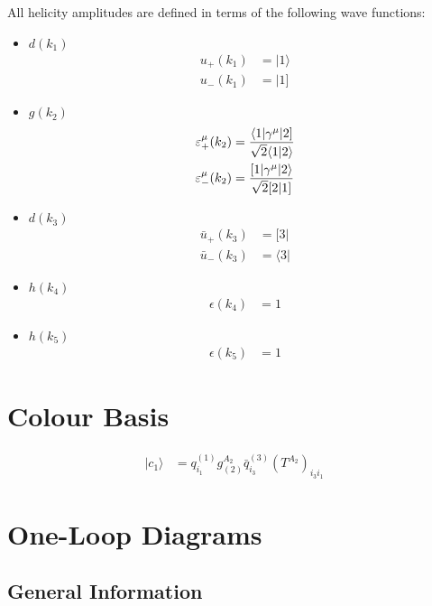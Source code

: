 \documentclass[a4paper]{article}
\newcommand{\bra}[1]{\langle #1 \vert}
\newcommand{\brb}[1]{[ #1 \vert}
\newcommand{\kea}[1]{\vert #1 \rangle}
\newcommand{\keb}[1]{\vert #1 ]}
\newcommand{\Spaa}[1]{\langle #1 \rangle}
\newcommand{\Spab}[1]{\langle #1]}
\newcommand{\Spba}[1]{[ #1 \rangle}
\newcommand{\Spbb}[1]{[ #1 ]}
\begin{document}
All helicity amplitudes are defined in terms of the following wave functions:
\begin{itemize}
\item $d(k_{1})$ 
\begin{align}
u_+(k_{1}) &= \kea{1}\\
u_-(k_{1}) &= \keb{1}
\end{align}
\item $g(k_{2})$ 
\begin{align}
\varepsilon^\mu_+(k_{2}) &=
   \frac{\Spab{1\vert\gamma^\mu\vert 2}}{%
   \sqrt{2}\Spaa{1\vert 2}}\\
\varepsilon^\mu_-(k_{2}) &=
   \frac{\Spba{1\vert\gamma^\mu\vert 2}}{%
   \sqrt{2}\Spbb{2\vert 1}}
\end{align}
\item $d(k_3)$ 
\begin{align}
\bar{u}_+(k_{3}) &= \brb{3}\\
\bar{u}_-(k_{3}) &= \bra{3}
\end{align}
\item $h(k_4)$ 
\begin{align}
\epsilon(k_{4}) &= 1
\end{align}
\item $h(k_5)$ 
\begin{align}
\epsilon(k_{5}) &= 1
\end{align}
\end{itemize}

\section{Colour Basis}
\begin{align}
\vert c_{1}\rangle &=q_{i_{1}}^{(1)}g^{A_{2}}_{(2)}\bar{q}_{i_{3}}^{(3)}\left(T^{A_{2}}\right)_{i_{3}i_{1}}
\end{align}




\section{One-Loop Diagrams}
\subsection*{General Information}

\end{document}
